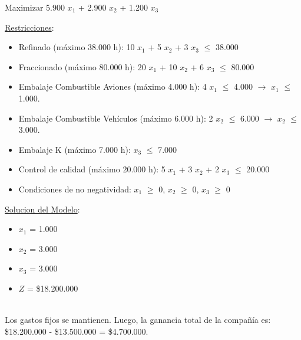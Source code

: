 \documentclass[10pt,a4paper]{article}
\begin{document}
\begin{enumerate}[label=\textbf{\sffamily\large\arabic*.}]
\begin{center}
        Maximizar 5.900 $x_{1}$ + 2.900 $x_{2}$ + 1.200 $x_{3}$

    \end{center}

    \underline{Restricciones}: 

    \begin{itemize}

        \item Refinado (máximo 38.000 h): 10 $x_{1}$ + 5 $x_{2}$ + 3 $x_{3}$ $\leq$ 38.000
        \item Fraccionado (máximo 80.000 h): 20 $x_{1}$ + 10 $x_{2}$ + 6 $x_{3}$ $\leq$ 80.000
        \item Embalaje Combustible Aviones (máximo 4.000 h): 4 $x_{1}$ $\leq$ 4.000 $\rightarrow$ $x_{1}$ $\leq$ 1.000.
        \item Embalaje Combustible Vehículos (máximo 6.000 h): 2 $x_{2}$ $\leq$ 6.000 $\rightarrow$ $x_{2}$ $\leq$ 3.000.
        \item Embalaje K (máximo 7.000 h): $x_{3}$ $\leq$ 7.000
        \item Control de calidad (máximo 20.000 h): 5 $x_{1}$ + 3 $x_{2}$ + 2 $x_{3}$ $\leq$ 20.000
        \item Condiciones de no negatividad: $x_{1}$ $\geq$ 0, $x_{2}$ $\geq$ 0, $x_{3}$ $\geq$ 0\\

    \end{itemize}

    \underline{Solucion del Modelo}: 

    \begin{itemize}

        \item $x_{1}$ = 1.000
        \item $x_{2}$ = 3.000
        \item $x_{3}$ = 3.000
        \item $Z$ = \$18.200.000 \\\

    \end{itemize}
    

    Los gastos fijos se mantienen. Luego, la ganancia total de la compañía es: \$18.200.000 - \$13.500.000 = \$4.700.000. \\
\end{enumerate}
\end{document}
